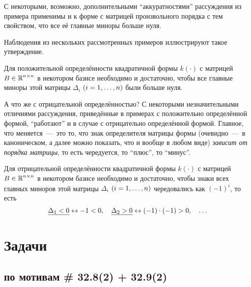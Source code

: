 \documentclass[a4paper,12pt]{article}
\begin{document}
  С некоторыми, возможно, дополнительными ``аккуратностями'' рассуждения из примера применимы и к форме с матрицей произвольного порядка с тем свойством, что все её главные миноры больше нуля.
  
  Наблюдения из нескольких рассмотренных примеров иллюстрируют такое утверждение.
  
  \begin{theorem}
    Для положительной определённости квадратичной формы $k(\cdot)$ с матрицей $B \hm\in \RR^{n \times n}$ в некотором базисе необходимо и достаточно, чтобы все главные миноры этой матрицы $\Delta_i$ $(i \hm= 1, \ldots, n)$ были больше нуля.
  \end{theorem}
  
  А что же с отрицательной определённостью?
  С некоторыми незначительными отличиями рассуждения, приведённые в примерах с положительно определённой формой, ``работают''  и в случае с отрицательно определённой формой.
  Главное, что меняется~---~это то, что знак определителя матрицы формы (очевидно~---~в каноническом, а далее можно показать, что и вообще в любом виде) \emph{зависит от порядка матрицы}, то есть чередуется, то ``плюс'', то ``минус''.
  
  \begin{theorem}
    Для отрицательной определённости квадратичной формы $k(\cdot)$ с матрицей $B \hm\in \RR^{n \times n}$ в некотором базисе необходимо и достаточно, чтобы знаки всех главных миноров этой матрицы $\Delta_i$ $(i \hm= 1, \ldots, n)$ чередовались как $(-1)^i$, то есть
    \[
      \underline{\Delta_1 \hm< 0} \leftrightarrow -1 \hm < 0,\quad \underline{\Delta_2 \hm> 0} \leftrightarrow (-1) \cdot (-1) \hm> 0,\quad \ldots
    \]
  \end{theorem}


  \section{Задачи}
  
  \subsection{по мотивам \# 32.8(2) + 32.9(2)}
  
\end{document}

